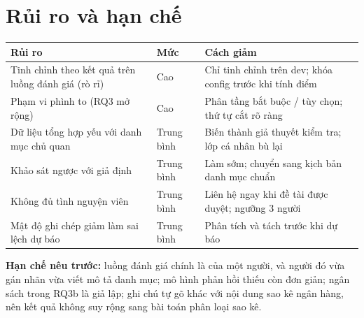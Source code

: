 \documentclass[12pt,a4paper]{article}
\begin{document}
\section{Rủi ro và hạn chế}
\begin{table}[H]
\centering\small
\begin{tabularx}{\linewidth}{L l L}
\toprule
Rủi ro & Mức & Cách giảm \\
\midrule
Tinh chỉnh theo kết quả trên luồng đánh giá (rò rỉ) & Cao & Chỉ tinh chỉnh trên dev; khóa config trước khi tính điểm \\
Phạm vi phình to (RQ3 mở rộng) & Cao & Phân tầng bắt buộc / tùy chọn; thứ tự cắt rõ ràng \\
Dữ liệu tổng hợp yếu với danh mục chủ quan & Trung bình & Biến thành giả thuyết kiểm tra; lớp cá nhân bù lại \\
Khảo sát ngược với giả định & Trung bình & Làm sớm; chuyển sang kịch bản danh mục chuẩn \\
Không đủ tình nguyện viên & Trung bình & Liên hệ ngay khi đề tài được duyệt; ngưỡng 3 người \\
Mật độ ghi chép giảm làm sai lệch dự báo & Trung bình & Phân tích và tách trước khi dự báo \\
\bottomrule
\end{tabularx}
\end{table}

\textbf{Hạn chế nêu trước:} luồng đánh giá chính là của một người, và người đó vừa gán nhãn vừa viết mô tả danh mục; mô hình phản hồi thiếu còn đơn giản; ngân sách trong RQ3b là giả lập; ghi chú tự gõ khác với nội dung sao kê ngân hàng, nên kết quả không suy rộng sang bài toán phân loại sao kê.



\end{document}
